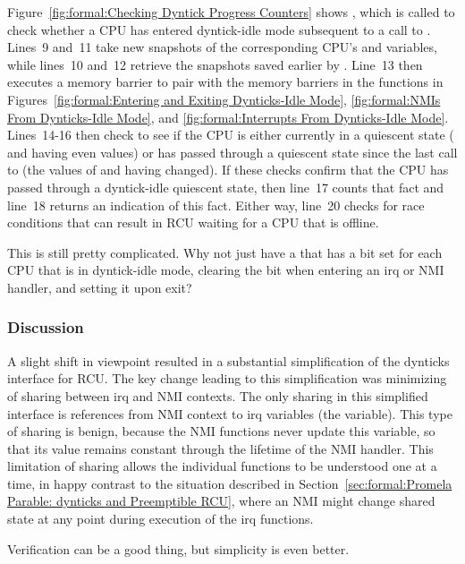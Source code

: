 Figure~\ref{fig:formal:Checking Dyntick Progress Counters}
shows , which is called to check
whether a CPU has entered dyntick-idle mode subsequent to a call
to .
Lines~9 and~11 take new snapshots of the corresponding CPU's
 and  variables, while lines~10 and~12
retrieve the snapshots saved earlier by
.
Line~13 then
executes a memory barrier to pair with the memory barriers in
the functions in
Figures~\ref{fig:formal:Entering and Exiting Dynticks-Idle Mode},
\ref{fig:formal:NMIs From Dynticks-Idle Mode}, and
\ref{fig:formal:Interrupts From Dynticks-Idle Mode}.
Lines~14-16 then check to see if the CPU is either currently in
a quiescent state ( and  having even values) or
has passed through a quiescent state since the last call to
 (the values of
 and  having changed).
If these checks confirm that the CPU has passed through a dyntick-idle
quiescent state, then line~17 counts that fact and line~18 returns
an indication of this fact.
Either way, line~20 checks for race conditions that can result in RCU
waiting for a CPU that is offline.

\QuickQuiz{}
	This is still pretty complicated.
	Why not just have a  that has a bit set for
	each CPU that is in dyntick-idle mode, clearing the bit
	when entering an irq or NMI handler, and setting it upon
	exit?
 \QuickQuizEnd

\subsubsection{Discussion}
\label{sec:formal:Discussion}

A slight shift in viewpoint resulted in a substantial simplification
of the dynticks interface for RCU.
The key change leading to this simplification was minimizing of
sharing between irq and NMI contexts.
The only sharing in this simplified interface is references from NMI
context to irq variables (the  variable).
This type of sharing is benign, because the NMI functions never update
this variable, so that its value remains constant through the lifetime
of the NMI handler.
This limitation of sharing allows the individual functions to be
understood one at a time, in happy contrast to the situation
described in
Section~\ref{sec:formal:Promela Parable: dynticks and Preemptible RCU},
where an NMI might change shared state at any point during execution of
the irq functions.

Verification can be a good thing, but simplicity is even better.
